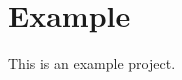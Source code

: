 \documentclass{article}
\begin{document}
\section{Example}
This is an example project.
\end{document}
